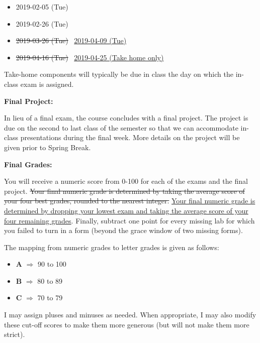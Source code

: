 \documentclass[12pt]{article}
\begin{document}
\begin{itemize}\setlength\itemsep{0em}
\item 2019-02-05 (Tue)
\item 2019-02-26 (Tue)
\item \st{2019-03-26 (Tue)} \, \ul{2019-04-09 (Tue)}
\item \st{2019-04-16 (Tue)} \, \ul{2019-04-25 (Take home only)}
\end{itemize}

Take-home components will typically be due in class the day on which the
in-class exam is assigned.

\vspace{0.4cm}

\textbf{Final Project:} \vspace{6pt}

In lieu of a final exam, the course concludes with a final project.
The project is due on the second to last class of the semester so that we can
accommodate in-class presentations during the final week. More details on the
project will be given prior to Spring Break.

\vspace{0.4cm}

\textbf{Final Grades:} \vspace{6pt}

You will receive a numeric score from 0-100 for each of the exams and the
final project. \st{Your final numeric grade is determined by taking the average
score of your four best grades, rounded to the nearest integer.} \ul{Your
final numeric grade is determined by dropping your lowest exam and taking
the average score of your four remaining grades}. Finally,
subtract one point for every missing lab for which you failed to turn in a
form (beyond the grace window of two missing forms).

\medskip

The mapping from numeric grades to letter grades is given as follows:
\begin{itemize}\setlength\itemsep{0em}
\item[] \textbf{A} $\Rightarrow$ 90 to 100
\item[] \textbf{B} $\Rightarrow$ 80 to 89
\item[] \textbf{C} $\Rightarrow$ 70 to 79
\end{itemize}
I may assign pluses and minuses as needed. When appropriate, I may also modify
these cut-off scores to make them more generous (but will not make them more
strict).
\end{document}
